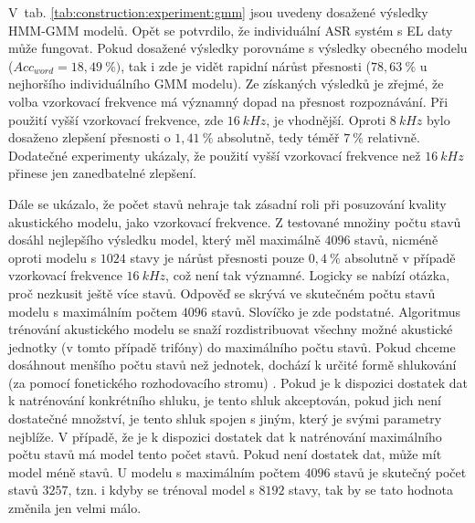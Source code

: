 
V~tab. \ref{tab:construction:experiment:gmm} jsou uvedeny dosažené výsledky HMM-GMM modelů.
Opět se potvrdilo, že individuální ASR systém s EL daty může fungovat.
Pokud dosažené výsledky porovnáme s výsledky obecného modelu ($Acc_{word} = 18,49\ \%)$, tak i zde je vidět rapidní nárůst přesnosti ($78,63\ \%$ u nejhoršího individuálního GMM modelu).
Ze získaných výsledků je zřejmé, že volba vzorkovací frekvence má významný dopad na přesnost rozpoznávání.
Při použití vyšší vzorkovací frekvence, zde $16\ kHz$, je vhodnější.
Oproti $8\ kHz$ bylo dosaženo zlepšení přesnosti o $1,41\ \%$ absolutně, tedy téměř $7\ \%$ relativně.
Dodatečné experimenty ukázaly, že použití vyšší vzorkovací frekvence než $16\ kHz$ přinese jen zanedbatelné zlepšení.

Dále se ukázalo, že počet stavů nehraje tak zásadní roli při posuzování kvality akustického modelu, jako vzorkovací frekvence.
Z testované množiny počtu stavů dosáhl nejlepšího výsledku model, který měl maximálně $4096$ stavů, nicméně oproti modelu s $1024$ stavy je nárůst přesnosti pouze $0,4\ \%$ absolutně v případě vzorkovací frekvence $16\ kHz$, což není tak významné.
Logicky se nabízí otázka, proč nezkusit ještě více stavů.
Odpověď se skrývá ve skutečném počtu stavů modelu s maximálním počtem $4096$ stavů.
Slovíčko  je zde podstatné.
Algoritmus trénování akustického modelu se snaží rozdistribuovat všechny možné akustické jednotky (v tomto případě trifóny) do maximálního počtu stavů.
Pokud chceme dosáhnout menšího počtu stavů než jednotek, dochází k určité formě shlukování (za pomocí fonetického rozhodovacího stromu) \cite{Holmes2001}.
Pokud je k dispozici dostatek dat k natrénování konkrétního shluku, je tento shluk akceptován, pokud jich není dostatečné množství, je tento shluk spojen s jiným, který je svými parametry nejblíže.
V případě, že je k dispozici dostatek dat k natrénování maximálního počtu stavů má model tento počet stavů.
Pokud není dostatek dat, může mít model méně stavů.
U modelu s maximálním počtem $4096$ stavů je skutečný počet stavů $3257$, tzn. i kdyby se trénoval model s $8192$ stavy, tak by se tato hodnota změnila jen velmi málo.

